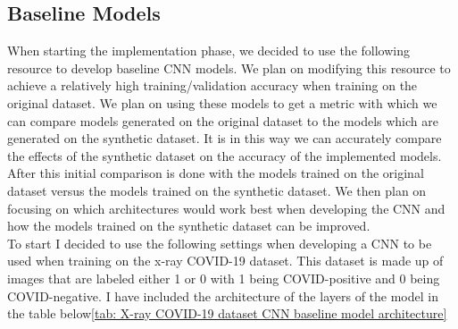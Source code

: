 \subsection{Baseline Models}
When starting the implementation phase, we decided to use the following resource to develop baseline CNN models\cite{imageClassificationKeras}.  We plan on modifying this resource to achieve a relatively high training/validation accuracy when training on the original dataset.  We plan on using these models to get a metric with which we can compare models generated on the original dataset to the models which are generated on the synthetic dataset.  It is in this way we can accurately compare the effects of the synthetic dataset on the accuracy of the implemented models.
\\
After this initial comparison is done with the models trained on the original dataset versus the models trained on the synthetic dataset.  We then plan on focusing on which architectures would work best when developing the CNN and how the models trained on the synthetic dataset can be improved.
\\
To start I decided to use the following settings when developing a CNN to be used when training on the x-ray COVID-19 dataset.  This dataset is made up of images that are labeled either 1 or 0 with 1 being COVID-positive and 0 being COVID-negative.  I have included the architecture of the layers of the model in the table below\ref{tab: X-ray COVID-19 dataset CNN baseline model architecture}
\begin{table}[H]
    \centering
    \caption{ X-ray COVID-19 dataset CNN baseline model architecture}
    \label{tab: X-ray COVID-19 dataset CNN baseline model architecture}
\end{table}
